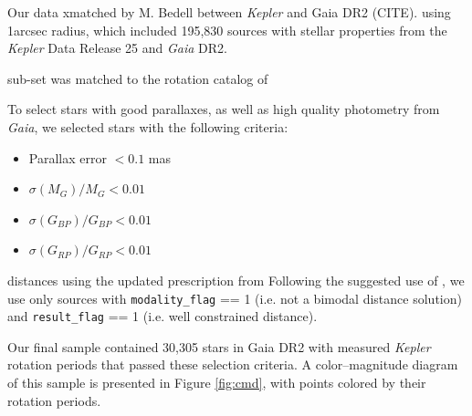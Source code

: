 \documentclass[preprint2]{aastex62}
\newcommand{\Kepler}{\textsl{Kepler}\xspace}
\begin{document}


Our 
data xmatched by M. Bedell between \Kepler and Gaia DR2 (CITE). using 1arcsec radius, which included 195,830 sources with stellar properties from the \Kepler Data Release 25 and {\em Gaia} DR2.

sub-set was matched to the rotation catalog of \citet{mcquillan2014}

To select stars with good parallaxes, as well as high quality photometry from {\em Gaia}, we selected stars with the following criteria:
\begin{itemize}
\item Parallax error $< 0.1$ mas
\item $\sigma(M_{G}) / M_{G} < 0.01$
\item $\sigma(G_{BP}) /G_{BP} < 0.01$
\item $\sigma(G_{RP}) /G_{RP} < 0.01$
\end{itemize}

distances using the updated prescription from \citet{bailer-jones2018}
Following the suggested use of \citet{bailer-jones2018}, we use only sources with {\tt modality\_flag} == 1 (i.e. not a bimodal distance solution) and {\tt result\_flag} == 1 (i.e. well constrained distance).
              

Our final sample contained 30,305 stars in Gaia DR2 with measured \Kepler rotation periods that passed these selection criteria. A color--magnitude diagram of this sample is presented in Figure \ref{fig:cmd}, with points colored by their rotation periods.
\end{document}
